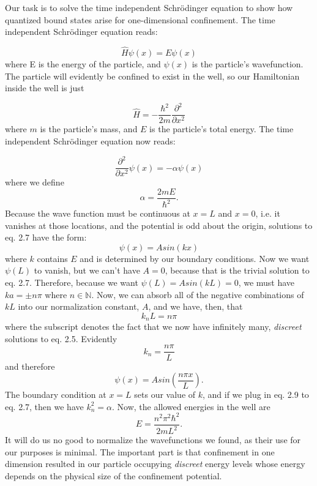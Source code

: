 Our task is to solve the time independent Schr\"{o}dinger equation to show how quantized bound states arise for one-dimensional confinement. The time independent Schr\"{o}dinger equation reads:

\begin{equation}
\hat{H} \psi(x) = E\psi(x)
\end{equation}
where E is the energy of the particle, and $\psi(x)$ is the particle's wavefunction. The particle will evidently be confined to exist in the well, so our Hamiltonian inside the well is just

\begin{equation}
\hat{H} = - \frac{\hbar^2}{2m} \frac{\partial^2}{\partial x^2}
\label{hamil}
\end{equation}
where $m$ is the particle's mass, and $E$ is the particle's  total energy. The time independent Schr\"{o}dinger equation now reads:

\begin{equation} \label{tise}
\frac{\partial^2}{\partial x^2} \psi(x) = - \alpha \psi(x)
\end{equation}
where we define 
\begin{equation}
\alpha = \frac{2mE}{\hbar^2}.
\end{equation}
Because the wave function must be continuous at $x = L$ and $ x = 0$, i.e. it vanishes at those locations, and the potential is odd about the origin,  solutions to eq. 2.7 have the form:
\begin{equation} \label{soln1}
\psi(x) = A sin(k x) 
\end{equation}
where $k$ contains $E$ and is determined by our boundary conditions. Now we want $\psi(L)$ to vanish, but we can't have $A =0$, because that is the trivial solution to eq. 2.7. Therefore, because we want $\psi(L) = Asin(k L) = 0 $, we must have $ka = \pm n \pi$ where $n \in \mathbb{N}$. Now, we can absorb all of the negative combinations of $k L$ into our normalization constant, $A$, and we have, then, that 
\begin{equation}
k_n L = n \pi 
\end{equation}
where the subscript denotes the fact that we now have infinitely many, \textit{discreet} solutions to eq. 2.5. Evidently 
\begin{equation}
k_n = \frac{ n \pi}{L}
\end{equation}
and therefore
\begin{equation}
\psi(x) = A sin(\frac{n \pi x}{L}).
\end{equation}
The boundary condition at $x=L$ sets our value of $k$, and if we plug in eq. 2.9 to eq. 2.7, then we have $k_n^{2} = \alpha$. Now, the allowed energies in the well are 
\begin{equation}
E = \frac{n^2 \pi^2 \hbar^2}{2 m L^2}.
\end{equation}
It will do us no good to normalize the wavefunctions we found, as their use for our purposes is minimal. The important part is that confinement in one dimension resulted in our particle occupying \textit{discreet} energy levels whose energy depends on the physical size of the confinement potential. 

